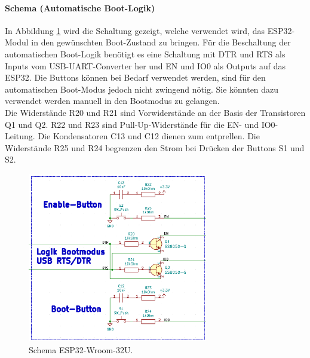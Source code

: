 
\paragraph{Schema (Automatische Boot-Logik)}\mbox{}

In Abbildung \ref{fig:Schema_ESP32_Flashbuttons} wird die Schaltung gezeigt, welche verwendet wird, das ESP32-Modul in den gewünschten Boot-Zustand zu bringen. Für die Beschaltung der automatischen Boot-Logik benötigt es eine Schaltung mit DTR und RTS als Inputs vom USB-UART-Converter her und EN und IO0 als Outputs auf das ESP32. Die Buttons können bei Bedarf verwendet werden, sind für den automatischen Boot-Modus jedoch nicht zwingend nötig. Sie könnten dazu verwendet werden manuell in den Bootmodus zu gelangen.\\
Die Widerstände R20 und R21 sind Vorwiderstände an der Basis der Transistoren Q1 und Q2. R22 und R23 sind Pull-Up-Widerstände für die EN- und IO0-Leitung. Die Kondensatoren C13 und C12 dienen zum entprellen. Die Widerstände R25 und R24 begrenzen den Strom bei Drücken der Buttons S1 und S2.


\begin{figure}[H]
	\centering
	\includegraphics[width=0.7\textwidth]{graphics/Schema_ESP32_Flashbuttons}
	\caption{Schema ESP32-Wroom-32U.}
	\label{fig:Schema_ESP32_Flashbuttons}
\end{figure}

